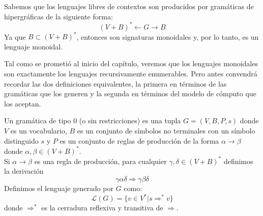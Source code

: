\documentclass[../main.tex]{subfiles}
\begin{document}
\begin{ej}
	Sabemos que los lenguajes libres de contextos son producidos por gramáticas de hipergráficas de la siguiente forma:
	\[
	(V+B)^* \leftarrow G \to B
	\]
	Ya que $B \subset (V+B)^*$, entonces son signaturas monoidales y, por lo tanto,  es un lenguaje monoidal.
\end{ej}
	
	Tal como se prometió al inicio del capítulo, veremos que los lenguajes monoidales son exactamente los lenguajes recursivamente enumerables. Pero antes convendrá recordar las dos definiciones equivalentes, la primera en términos de las gramáticas que los generen y la segunda en términos del modelo de cómputo que los aceptan. \\
	
\begin{dfn}
	Un gramática de tipo 0 (o sin restricciones) es una tupla $G=(V,B,P,s)$ donde $V$ es un vocabulario, $B$ es un conjunto de símbolos no terminales con un símbolo distinguido $s$ y $P$ es un conjunto de reglas de producción de la forma $\alpha \to \beta$ donde $\alpha, \beta \in (V+B)^*$.\\
	Si $\alpha \to \beta$ es una regla de producción, para cualquier $\gamma, \delta \in (V+B)^*$ definimos la derivación 
	\[ \gamma \alpha \delta \Rightarrow \gamma \beta \delta \]
	Definimos el lenguaje generado por $G$ como: 
	$$\mathcal{L}(G)= \{ v \in V^* | s \Rightarrow ^* v  \}$$
	donde $\Rightarrow ^*$ es la cerradura reflexiva y transitiva de $\Rightarrow$.
\end{dfn}
	
\end{document}
